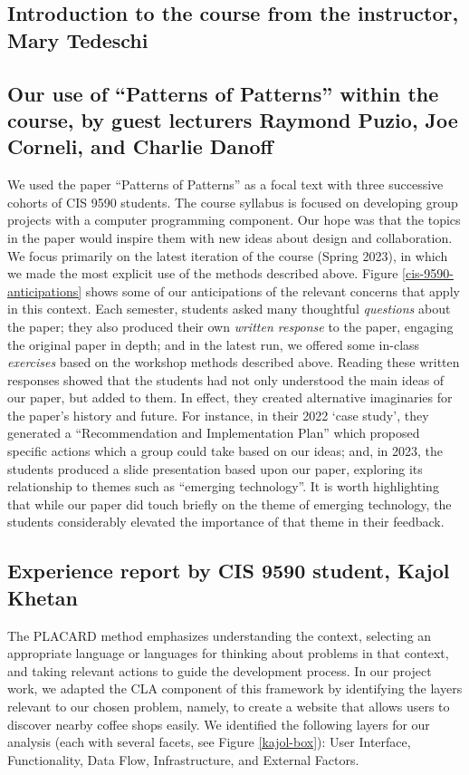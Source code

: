 \documentclass[acmlarge,timestamp]{acmart}
\begin{document}
\subsection{Introduction to the course from the instructor, Mary Tedeschi}


\subsection{Our use of “Patterns of Patterns” within the course, by guest lecturers Raymond Puzio, Joe Corneli, and Charlie Danoff}
\label{pop1-in-cis9590}
We used the paper “Patterns of Patterns” as a focal text with three
successive cohorts of CIS 9590 students.  The course syllabus is
focused on developing group projects with a computer programming
component.  Our hope was that the topics in the paper would inspire
them with new ideas about design and collaboration.  We focus
primarily on the latest iteration of the course (Spring 2023), in
which we made the most explicit use of the methods described above.
Figure \ref{cis-9590-anticipations} shows some of our anticipations of
the relevant concerns that apply in this context.
Each semester, students asked many thoughtful \emph{questions} about the
paper; they also produced their own \emph{written response} to the
paper, engaging the original paper in depth; and in the latest run, we
offered some in-class \emph{exercises} based on the workshop methods
described above.  Reading these written responses showed that the
students had not only understood the main ideas of our paper, but
added to them.  In effect, they created alternative imaginaries for
the paper’s history and future.  For instance, in their 2022 ‘case
study’, they generated a “Recommendation and Implementation Plan”
which proposed specific actions which a group could take based on our
ideas; and, in 2023, the students produced a slide presentation based
upon our paper, exploring its relationship to themes such as “emerging
technology”.  It is worth highlighting that while our paper did touch
briefly on the theme of emerging technology, the students considerably
elevated the importance of that theme in their feedback.

\subsection{Experience report by CIS 9590 student, Kajol Khetan}\label{sec:kajol-report}

The PLACARD method emphasizes understanding the context, selecting an
appropriate language or languages for thinking about problems in that
context, and taking relevant actions to guide the development process.
In our project work, we adapted the CLA component of this framework by
identifying the layers relevant to our chosen problem, namely, to
create a website that allows users to discover nearby coffee shops
easily.  We identified the following layers for our analysis (each
with several facets, see Figure \ref{kajol-box}): User Interface,
Functionality, Data Flow, Infrastructure, and External Factors.
\end{document}
